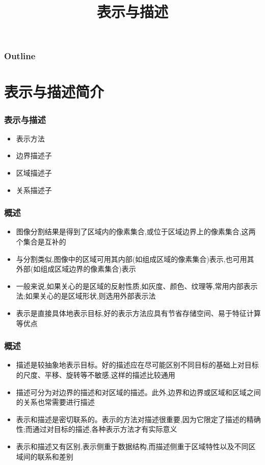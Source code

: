 \documentclass{beamer}
\title{表示与描述}
\author{}
\date{}
\begin{document}
\maketitle

\begin{frame}
\frametitle{Outline}
\setcounter{tocdepth}{3}
\tableofcontents
\end{frame}













\section{表示与描述简介}
\label{sec-1}
\begin{frame}
\frametitle{表示与描述}
\label{sec-1-1}

\begin{itemize}
\item 表示方法
\item 边界描述子
\item 区域描述子
\item 关系描述子
\end{itemize}
\end{frame}
\begin{frame}
\frametitle{概述}
\label{sec-1-2}

\begin{itemize}
\item 图像分割结果是得到了区域内的像素集合,或位于区域边界上的像素集合,这两个集合是互补的
\item 与分割类似,图像中的区域可用其内部(如组成区域的像素集合)表示,也可用其外部(如组成区域边界的像素集合)表示
\item 一般来说,如果关心的是区域的反射性质,如灰度、颜色、纹理等,常用内部表示法;如果关心的是区域形状,则选用外部表示法
\item 表示是直接具体地表示目标,好的表示方法应具有节省存储空间、易于特征计算等优点
\end{itemize}
\end{frame}
\begin{frame}
\frametitle{概述}
\label{sec-1-3}

\begin{itemize}
\item 描述是较抽象地表示目标。好的描述应在尽可能区别不同目标的基础上对目标的尺度、平移、旋转等不敏感,这样的描述比较通用
\item 描述可分为对边界的描述和对区域的描述。此外,边界和边界或区域和区域之间的关系也常需要进行描述
\item 表示和描述是密切联系的。表示的方法对描述很重要,因为它限定了描述的精确性;而通过对目标的描述,各种表示方法才有实际意义
\item 表示和描述又有区别,表示侧重于数据结构,而描述侧重于区域特性以及不同区域间的联系和差别
\end{itemize}
\end{frame}
\end{document}
